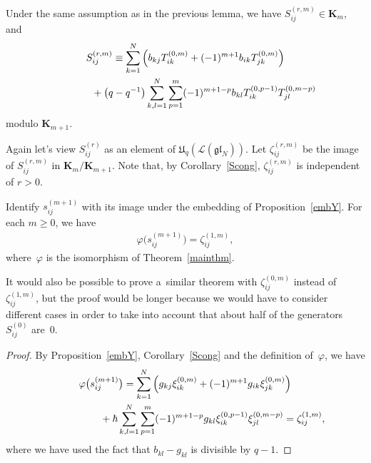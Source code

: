 \documentclass[pdftex]{sigma}
\numberwithin{theorem}{section}
\numberwithin{proposition}{section}
\numberwithin{lemma}{section}
\numberwithin{corollary}{section}
\numberwithin{definition}{section}
\numberwithin{example}{section}
\numberwithin{remark}{section}
\numberwithin{note}{section}
\numberwithin{equation}{section}
\begin{document}
\begin{corollary}
\label{Scong}
Under the same assumption as in the previous lemma, we have $S_{ij}^{(r,m)} \in \mathbf{K}_m$, and
\begin{gather*}
S_{ij}^{(r,m)} \equiv \sum\limits_{k=1}^N \left(b_{kj}T_{ik}^{(0,m)} + (-1)^{m+1} b_{ik} T_{jk}^{(0,m)}\right) \\
\hphantom{S_{ij}^{(r,m)} \equiv}{}
+
\big(q-q^{-1}\big) \sum\limits_{k,l=1}^N \sum\limits_{p=1}^m (-1)^{m+1-p} b_{kl} T_{ik}^{(0,p-1)} T_{jl}^{(0,m-p)}
\end{gather*}
modulo $\mathbf{K}_{m+1}$.
\end{corollary}
Again let's view $S_{ij}^{(r)}$ as an element of $\mathfrak{U}_q(\mathcal{L}(\mathfrak{gl}_N))$.
Let $\zeta_{ij}^{(r,m)}$ be the image of $S_{ij}^{(r,m)}$ in $\mathbf{K}_m/\mathbf{K}_{m+1}$.
Note that, by Corollary~\ref{Scong}, $\zeta_{ij}^{(r,m)}$ is independent of $r>0$.
\begin{theorem}
\label{twUqY}
Identify $s_{ij}^{(m+1)}$ with its image under the embedding of Proposition~{\rm \ref{embY}}.
For each $m \geq 0$, we have
\begin{gather*}
\varphi\big(s_{ij}^{(m+1)}\big)=\zeta_{ij}^{(1,m)},
\end{gather*}
where~$\varphi$ is the isomorphism of Theorem~{\rm \ref{mainthm}}.
\end{theorem}

\begin{remark}
It would also be possible to prove a~similar theorem with $\zeta_{ij}^{(0,m)}$ instead of $\zeta_{ij}^{(1,m)}$, but the
proof would be longer because we would have to consider dif\/ferent cases in order to take into account that about half of
the generators $S_{ij}^{(0)}$ are~$0$.
\end{remark}

\begin{proof}
By Proposition~\ref{embY}, Corollary~\ref{Scong} and the def\/inition of~$\varphi$, we have
\begin{gather*}
\varphi\big(s_{ij}^{(m+1)}\big)=\sum\limits_{k=1}^N \left(g_{kj} \xi_{ik}^{(0,m)} + (-1)^{m+1} g_{ik} \xi_{jk}^{(0,m)}\right)
\\
\hphantom{\varphi\big(s_{ij}^{(m+1)}\big)=}{}
+ \hbar \sum\limits_{k,l=1}^N \sum\limits_{p=1}^m (-1)^{m+1-p} g_{kl} \xi_{ik}^{(0,p-1)} \xi_{jl}^{(0,m-p)}
  = \zeta_{ij}^{(1,m)},
\end{gather*}
where we have used the fact that $b_{kl}-g_{kl}$ is divisible by $q-1$.
\end{proof}
\end{document}
